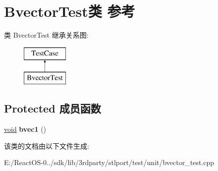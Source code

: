 \hypertarget{class_bvector_test}{}\section{Bvector\+Test类 参考}
\label{class_bvector_test}
类 Bvector\+Test 继承关系图\+:\begin{figure}[H]
\begin{center}
\leavevmode
\includegraphics[height=2.000000cm]{class_bvector_test}
\end{center}
\end{figure}
\subsection*{Protected 成员函数}
\begin{DoxyCompactItemize}
\item 
\mbox{\label{class_bvector_test_ada27d95ad6edf956c02643f99b6dedfc}} 
\hyperlink{interfacevoid}{void} {\bfseries bvec1} ()
\end{DoxyCompactItemize}


该类的文档由以下文件生成\+:\begin{DoxyCompactItemize}
\item 
E\+:/\+React\+O\+S-\/0../sdk/lib/3rdparty/stlport/test/unit/bvector\+\_\+test.\+cpp\end{DoxyCompactItemize}
